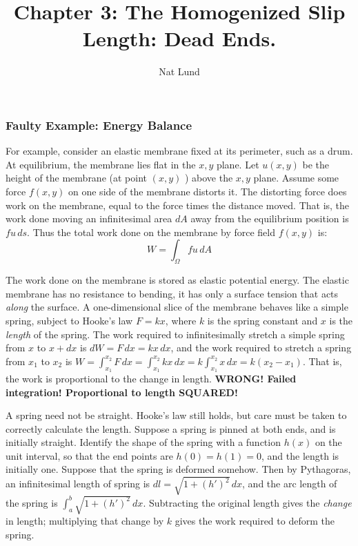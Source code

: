 \documentclass[a4paper]{report}
\title{Chapter 3: The Homogenized Slip Length: Dead Ends.}
\author{Nat Lund}
\begin{document}
\subsubsection*{Faulty Example: Energy Balance}

For example, consider an elastic membrane fixed at its perimeter, such as a drum.  At equilibrium, the membrane lies flat in the $x,y$ plane.  Let $u(x,y)$ be the height of the membrane (at point $(x,y)$ ) above the $x,y$ plane.  Assume some force $f(x,y)$ on one side of the membrane distorts it.  The distorting force does work on the membrane, equal to the force times the distance moved. That is, the work done moving an infinitesimal area $dA$ away from the equilibrium position is $fu \,ds$.  Thus the total work done on the membrane by force field $f(x,y)$ is:
\begin{equation}
W = \int_{\Omega} f u \,dA
\end{equation} 

The work done on the membrane is stored as elastic potential energy.  The elastic membrane has no resistance to bending, it has only a surface tension that acts \emph{along} the surface.  
A one-dimensional slice of the membrane behaves like a simple spring, subject to Hooke's law $F = kx$, where $k$ is the spring constant and $x$ is the \emph{length} of the spring. The work required to infinitesimally stretch a simple spring from $x$ to $ x + dx$ is $ dW = F \, dx = kx \,dx$, and the work required to stretch a spring from $x_1$ to $x_2$ is $W = \int_{x_1}^{x_2} F \,dx = \int_{x_1}^{x_2} k x \,dx = k \int_{x_1}^{x_2} x \,dx = k(x_2 - x_1)$. That is, the work is proportional to the change in length. 
\textbf{WRONG! Failed integration! Proportional to length SQUARED!}

A spring need not be straight.  Hooke's law still holds, but care must be taken to correctly calculate the length.
Suppose a spring is pinned at both ends, and is initially straight.
Identify the shape of the spring with a function $h(x)$ on the unit interval, so that the end points are $h(0) = h(1) = 0$, and the length is initially one.  Suppose that the spring is deformed somehow.  Then by Pythagoras, an infinitesimal length of spring is $dl = \sqrt{1 + (h')^2} \,dx$, and the arc length of the spring is $ \int_a^b \sqrt{1 + (h')^2} \, dx$.  Subtracting the original length gives the \emph{change} in length; multiplying that change by $k$ gives the work required to deform the spring.
\end{document}
